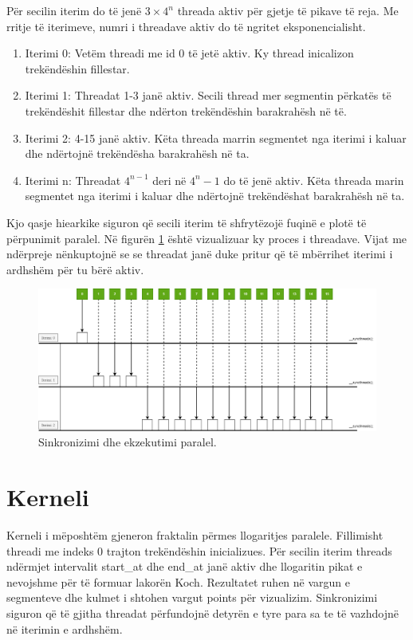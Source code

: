 \noindent Për secilin iterim do të jenë \( 3 \times 4^n \)  threada aktiv për gjetje të pikave të reja. Me rritje të iterimeve, numri i threadave aktiv do të ngritet eksponencialisht.

\begin{enumerate}
\item Iterimi 0: Vetëm threadi me id 0 të jetë aktiv. Ky thread inicalizon trekëndëshin fillestar.
\item Iterimi 1: Threadat 1-3 janë aktiv. Secili thread mer segmentin përkatës të trekëndëshit fillestar dhe ndërton trekëndëshin barakrahësh në të.   
\item Iterimi 2: 4-15 janë aktiv. Këta threada marrin segmentet nga iterimi i kaluar dhe ndërtojnë trekëndësha barakrahësh në ta.
\item Iterimi n: Threadat \(4^{n-1}\) deri në \(4^n-1\) do të jenë aktiv. Këta threada marin segmentet nga iterimi i kaluar dhe ndërtojnë trekëndëshat barakrahësh në ta. 

\end{enumerate}

\noindent Kjo qasje hiearkike siguron që secili iterim të shfrytëzojë fuqinë e plotë të përpunimit paralel. Në figurën \ref{fig:koch_threads} është vizualizuar ky proces i threadave. Vijat me ndërpreje nënkuptojnë se se threadat janë duke pritur që të mbërrihet iterimi i ardhshëm për tu bërë aktiv.

\begin{figure}[!]
    \centering
    \includegraphics[width=1\linewidth]{koch_6.png}
    \caption{Sinkronizimi dhe ekzekutimi paralel.}
    \label{fig:koch_threads}
\end{figure}


\section{Kerneli}

Kerneli i mëposhtëm gjeneron fraktalin përmes llogaritjes paralele. Fillimisht threadi me indeks 0 trajton trekëndëshin inicializues. Për secilin iterim threads ndërmjet intervalit start\_at dhe end\_at janë aktiv dhe llogaritin pikat e nevojshme për të formuar lakorën Koch. Rezultatet ruhen në vargun e segmenteve dhe kulmet i shtohen vargut points për vizualizim. Sinkronizimi siguron që të gjitha threadat përfundojnë detyrën e tyre para sa te të vazhdojnë në iterimin e ardhshëm. \\


